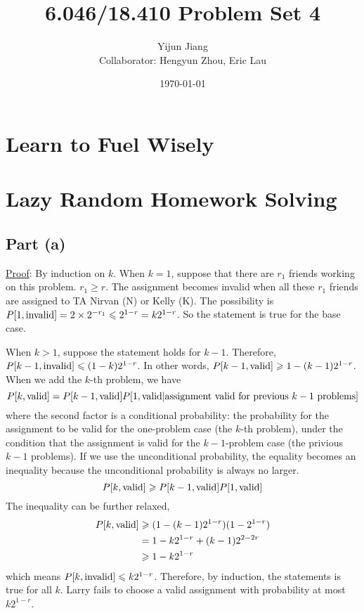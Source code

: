 \documentclass{article}
\title{6.046/18.410 Problem Set 4}
\author{Yijun Jiang\\Collaborator: Hengyun Zhou, Eric Lau}
\date{\today}
\begin{document}
\maketitle
\section{Learn to Fuel Wisely}

\section{Lazy Random Homework Solving}
\subsection{Part (a)}
\noindent\underline{Proof}: By induction on $k$. When $k=1$, suppose that there are $r_1$ friends working on this problem. $r_1\geqslant r$. The assignment becomes invalid when all these $r_1$ friends are assigned to TA Nirvan (N) or Kelly (K). The possibility is $P[1,\textup{invalid}]=2\times2^{-r_1}\leqslant 2^{1-r}=k2^{1-r}$. So the statement is true for the base case.

When $k>1$, suppose the statement holds for $k-1$. Therefore, $P[k-1,\textup{invalid}]\leqslant(1-k)2^{1-r}$. In other words, $P[k-1,\textup{valid}]\geqslant 1-(k-1)2^{1-r}$. When we add the $k$-th problem, we have
\begin{equation*}
	P[k,\textup{valid}]=P[k-1,\textup{valid}]P[1,\textup{valid}|\textup{assignment valid for previous $k-1$ problems}]
\end{equation*}
where the second factor is a conditional probability: the probability for the assignment to be valid for the one-problem case (the $k$-th problem), under the condition that the assignment is valid for the $k-1$-problem case (the privious $k-1$ problems). If we use the unconditional probability, the equality becomes an inequality because the unconditional probability is always no larger.
\begin{equation*}
	P[k,\textup{valid}]\geqslant P[k-1,\textup{valid}]P[1,\textup{valid}]
\end{equation*}
The inequality can be further relaxed,
\begin{align*}
	P[k,\textup{valid}]&\geqslant(1-(k-1)2^{1-r})(1-2^{1-r})\\
	&=1-k2^{1-r}+(k-1)2^{2-2r}\\
	&\geqslant1-k2^{1-r}
\end{align*}
which means $P[k,\textup{invalid}]\leqslant k2^{1-r}$. Therefore, by induction, the statements is true for all $k$. Larry fails to choose a valid assignment with probability at most $k2^{1-r}$.
\end{document}
